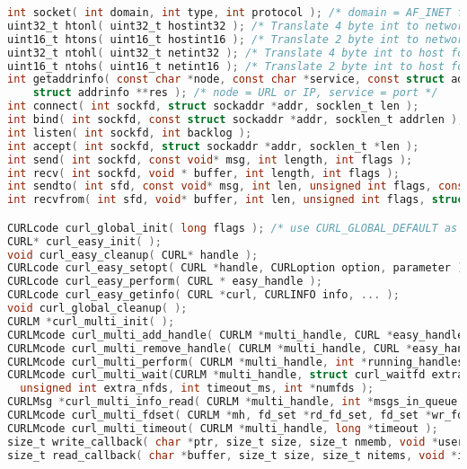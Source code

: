 \documentclass[legalpaper,10pt]{article}
\begin{document}
\begin{lstlisting}[language=C]
int socket( int domain, int type, int protocol ); /* domain = AF_INET for IPv4 */
uint32_t htonl( uint32_t hostint32 ); /* Translate 4 byte int to network format */ 
uint16_t htons( uint16_t hostint16 ); /* Translate 2 byte int to network format */ 
uint32_t ntohl( uint32_t netint32 ); /* Translate 4 byte int to host format */ 
uint16_t ntohs( uint16_t netint16 ); /* Translate 2 byte int to host format */
int getaddrinfo( const char *node, const char *service, const struct addrinfo *hints, 
    struct addrinfo **res ); /* node = URL or IP, service = port */
int connect( int sockfd, struct sockaddr *addr, socklen_t len );
int bind( int sockfd, const struct sockaddr *addr, socklen_t addrlen );
int listen( int sockfd, int backlog );
int accept( int sockfd, struct sockaddr *addr, socklen_t *len );
int send( int sockfd, const void* msg, int length, int flags );
int recv( int sockfd, void * buffer, int length, int flags );
int sendto( int sfd, const void* msg, int len, unsigned int flags, const struct sockaddr* to, socklen_t token );
int recvfrom( int sfd, void* buffer, int len, unsigned int flags, struct sockaddr* from, int* fromlength );

CURLcode curl_global_init( long flags ); /* use CURL_GLOBAL_DEFAULT as flags */
CURL* curl_easy_init( );
void curl_easy_cleanup( CURL* handle );
CURLcode curl_easy_setopt( CURL *handle, CURLoption option, parameter ); /* See table below */
CURLcode curl_easy_perform( CURL * easy_handle );
CURLcode curl_easy_getinfo( CURL *curl, CURLINFO info, ... );
void curl_global_cleanup( );
CURLM *curl_multi_init( );
CURLMcode curl_multi_add_handle( CURLM *multi_handle, CURL *easy_handle );
CURLMcode curl_multi_remove_handle( CURLM *multi_handle, CURL *easy_handle );
CURLMcode curl_multi_perform( CURLM *multi_handle, int *running_handles );
CURLMcode curl_multi_wait(CURLM *multi_handle, struct curl_waitfd extra_fds[],
  unsigned int extra_nfds, int timeout_ms, int *numfds );
CURLMsg *curl_multi_info_read( CURLM *multi_handle, int *msgs_in_queue );
CURLMcode curl_multi_fdset( CURLM *mh, fd_set *rd_fd_set, fd_set *wr_fd_set, fd_set *ex_fd_set, int *max_fd );
CURLMcode curl_multi_timeout( CURLM *multi_handle, long *timeout );
size_t write_callback( char *ptr, size_t size, size_t nmemb, void *userdata );
size_t read_callback( char *buffer, size_t size, size_t nitems, void *inputdata );
\end{lstlisting}
\end{document}
